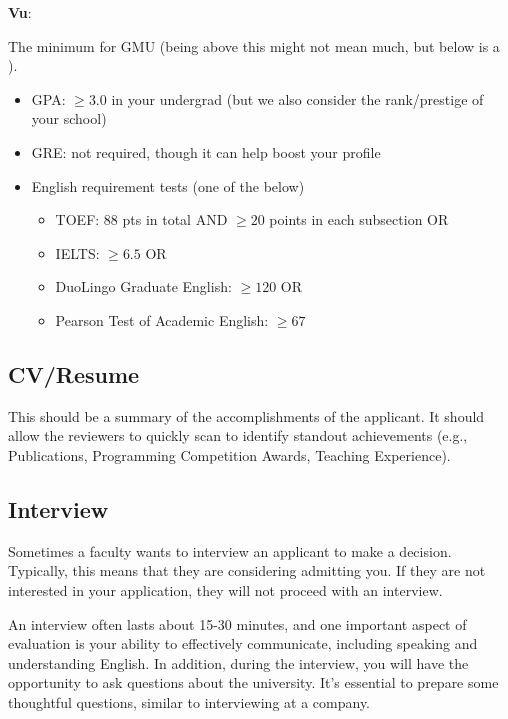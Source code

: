 \documentclass[11pt]{article}
\newenvironment{commentbox}[1][]{
\small
    \begin{cbox}
    \textbf{#1}: 
 }{
   \end{cbox}
}
\newcommand{\red}[1]{{\color{red}{#1}}}
\begin{document}
\begin{commentbox}[Vu]
The minimum for GMU (being above this might not mean much, but below is a \red{red flag}).
\begin{itemize}
\item GPA: $\ge 3.0$ in your undergrad (but we also consider the rank/prestige of your school)
\item GRE: not required, though it can help boost your profile
\item English requirement tests (one of the below)
  \begin{itemize}    
  \item TOEF: 88 pts in total AND $\ge 20$ points in each subsection OR
  \item IELTS: $\ge 6.5$ OR
  \item DuoLingo Graduate English: $\ge 120$ OR 
  \item Pearson Test of Academic English: $\ge 67$
  \end{itemize}  
\end{itemize}
\end{commentbox}


\subsection{CV/Resume}
This should be a summary of the accomplishments of the applicant.  It should allow the reviewers to quickly scan to identify standout achievements (e.g., Publications, Programming Competition Awards, Teaching Experience).

\subsection{Interview}
Sometimes a faculty wants to interview an applicant to make a decision. Typically, this means that they are considering admitting you. If they are not interested in your application, they will not proceed with an interview. 

An interview often lasts about 15-30 minutes, and one important aspect of evaluation is your ability to effectively communicate, including speaking and understanding English. In addition, during the interview, you will have the opportunity to ask questions about the university. It's essential to prepare some thoughtful questions, similar to interviewing at a company.
\end{document}
